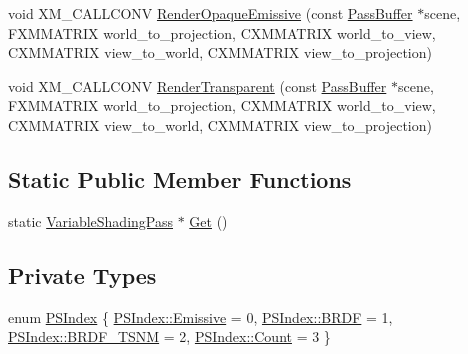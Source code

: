 \begin{DoxyCompactItemize}
\item 
void X\+M\+\_\+\+C\+A\+L\+L\+C\+O\+NV \hyperlink{classmage_1_1_variable_shading_pass_a5834dfcef783c743ceadd3b79b0609fb}{Render\+Opaque\+Emissive} (const \hyperlink{structmage_1_1_pass_buffer}{Pass\+Buffer} $\ast$scene, F\+X\+M\+M\+A\+T\+R\+IX world\+\_\+to\+\_\+projection, C\+X\+M\+M\+A\+T\+R\+IX world\+\_\+to\+\_\+view, C\+X\+M\+M\+A\+T\+R\+IX view\+\_\+to\+\_\+world, C\+X\+M\+M\+A\+T\+R\+IX view\+\_\+to\+\_\+projection)
\item 
void X\+M\+\_\+\+C\+A\+L\+L\+C\+O\+NV \hyperlink{classmage_1_1_variable_shading_pass_a49b738788dafc364dea02cded68c6a00}{Render\+Transparent} (const \hyperlink{structmage_1_1_pass_buffer}{Pass\+Buffer} $\ast$scene, F\+X\+M\+M\+A\+T\+R\+IX world\+\_\+to\+\_\+projection, C\+X\+M\+M\+A\+T\+R\+IX world\+\_\+to\+\_\+view, C\+X\+M\+M\+A\+T\+R\+IX view\+\_\+to\+\_\+world, C\+X\+M\+M\+A\+T\+R\+IX view\+\_\+to\+\_\+projection)
\end{DoxyCompactItemize}
\subsection*{Static Public Member Functions}
\begin{DoxyCompactItemize}
\item 
static \hyperlink{classmage_1_1_variable_shading_pass}{Variable\+Shading\+Pass} $\ast$ \hyperlink{classmage_1_1_variable_shading_pass_a4c5572071474485e60af17b34539a603}{Get} ()
\end{DoxyCompactItemize}
\subsection*{Private Types}
\begin{DoxyCompactItemize}
\item 
enum \hyperlink{classmage_1_1_variable_shading_pass_a49519e421ac5be93136d9efdbf075d4a}{P\+S\+Index} \{ \hyperlink{classmage_1_1_variable_shading_pass_a49519e421ac5be93136d9efdbf075d4aa3cb4ee67c41d819920d72fcc11b9b566}{P\+S\+Index\+::\+Emissive} = 0, 
\hyperlink{classmage_1_1_variable_shading_pass_a49519e421ac5be93136d9efdbf075d4aa4e69f1c58994758054563aa7392ffa4c}{P\+S\+Index\+::\+B\+R\+DF} = 1, 
\hyperlink{classmage_1_1_variable_shading_pass_a49519e421ac5be93136d9efdbf075d4aa12126b75c3073e66dcaed7ac43317a00}{P\+S\+Index\+::\+B\+R\+D\+F\+\_\+\+T\+S\+NM} = 2, 
\hyperlink{classmage_1_1_variable_shading_pass_a49519e421ac5be93136d9efdbf075d4aae93f994f01c537c4e2f7d8528c3eb5e9}{P\+S\+Index\+::\+Count} = 3
 \}
\end{DoxyCompactItemize}
